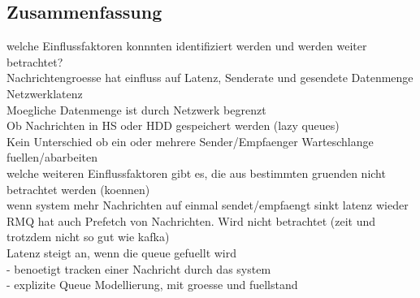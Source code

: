 

\subsection{Zusammenfassung}
welche Einflussfaktoren konnnten identifiziert werden und werden weiter betrachtet? \\
Nachrichtengroesse hat einfluss auf Latenz, Senderate und gesendete Datenmenge \\
Netzwerklatenz \\
Moegliche Datenmenge ist durch Netzwerk begrenzt\\
Ob Nachrichten in HS oder HDD gespeichert werden (lazy queues) \\
Kein Unterschied ob ein oder mehrere Sender/Empfaenger Warteschlange fuellen/abarbeiten \\

welche weiteren Einflussfaktoren gibt es, die aus bestimmten gruenden nicht betrachtet werden (koennen)\\
wenn system mehr Nachrichten auf einmal sendet/empfaengt sinkt latenz wieder \\
RMQ hat auch Prefetch von Nachrichten. Wird nicht betrachtet (zeit und trotzdem nicht so gut wie kafka) \\
Latenz steigt an, wenn die queue gefuellt wird \\
- benoetigt tracken einer Nachricht durch das system \\
- explizite Queue Modellierung, mit groesse und fuellstand \\




